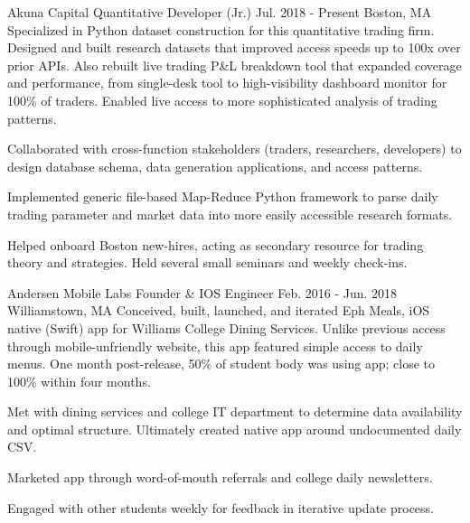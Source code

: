

\begin{cventries}
  \cventry
    {Akuna Capital}
    {Quantitative Developer (Jr.)}
    {Jul. 2018 - Present} %
    {Boston, MA} %
    {Specialized in Python dataset construction for this quantitative trading
    firm. Designed and built research datasets that improved access speeds up to
    100x over prior APIs. Also rebuilt live trading P\&L breakdown tool that
    expanded coverage and performance, from single-desk tool to high-visibility
    dashboard monitor for 100\% of traders. Enabled live access to more
    sophisticated analysis of trading patterns.}
    {\begin{cvitems} %
      \item Collaborated with cross-function stakeholders (traders,
            researchers, developers) to design database schema, data
            generation applications, and access patterns.
      \item Implemented generic file-based Map-Reduce Python framework to
            parse daily trading parameter and market data into more easily
            accessible research formats.
      \item Helped onboard Boston new-hires, acting as secondary resource
            for trading theory and strategies. Held several small seminars and
            weekly check-ins.
    \end{cvitems}}

\cventry
{Andersen Mobile Labs} %
{Founder \& IOS Engineer} %
{Feb. 2016 - Jun. 2018} %
{Williamstown, MA} %
{Conceived, built, launched, and iterated Eph Meals, iOS native (Swift) app for
Williams College Dining Services. Unlike previous access through
mobile-unfriendly website, this app featured simple access to daily menus. One
month post-release, 50\% of student body was using app; close to 100\% within
four months.}
{\begin{cvitems} %
\item Met with dining services and college IT department to determine data
availability and optimal structure. Ultimately created native app around
undocumented daily CSV.
\item Marketed app through word-of-mouth referrals and college daily
newsletters.
\item Engaged with other students weekly for feedback in iterative update
process.
\end{cvitems}}


\end{cventries}
